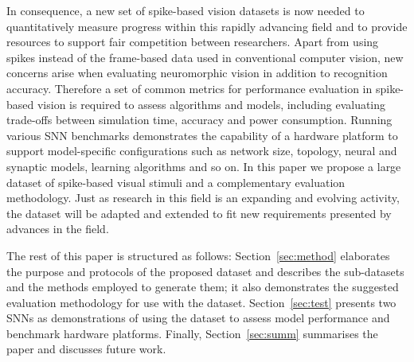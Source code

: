 \documentclass{frontiersENG} %
\begin{document}
In consequence, a new set of spike-based vision datasets is now needed to quantitatively measure progress within this rapidly advancing field and to provide resources to support fair competition between researchers.
Apart from using spikes instead of the frame-based data used in conventional computer vision, new concerns arise when evaluating neuromorphic vision in addition to recognition accuracy.
Therefore a set of common metrics for performance evaluation in spike-based vision is required to assess algorithms and models, including evaluating
trade-offs between simulation time, accuracy and power consumption.
Running various SNN benchmarks demonstrates the capability of a hardware platform to support model-specific configurations such as network size, topology, neural and synaptic models, learning algorithms and so on.
In this paper we propose a large dataset of spike-based visual stimuli and a complementary evaluation methodology.
Just as research in this field is an expanding and evolving activity, the dataset will be adapted and extended to fit new requirements presented by advances in the field.

The rest of this paper is structured as follows: Section~\ref{sec:method} elaborates the purpose and protocols of the proposed dataset and describes the sub-datasets and the methods employed to generate them; it also demonstrates the suggested evaluation methodology for use with the dataset.
Section~\ref{sec:test} presents two SNNs as demonstrations of using the dataset to assess model performance and benchmark hardware platforms.
Finally, Section~\ref{sec:summ} summarises the paper and discusses future work.
\end{document}
